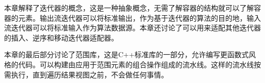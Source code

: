 本章解释了迭代器的概念，这是一种抽象概念，无需了解容器的结构就可以了解容器的元素。输出流迭代器可以将标准输出，作为基于迭代器的算法的目的地，输入流迭代器可以将标准输入作为算法数据源。本章还讨论了可以用来适配其他迭代器的插入、逆序和移动迭代器适配器。

本章的最后部分讨论了范围库，这是C++标准库的一部分，允许编写更函数式风格的代码。可以构建由应用于范围元素的组合操作组成的流水线。这样的流水线按需执行，直到遍历结果视图之前，不会做任何事情。
